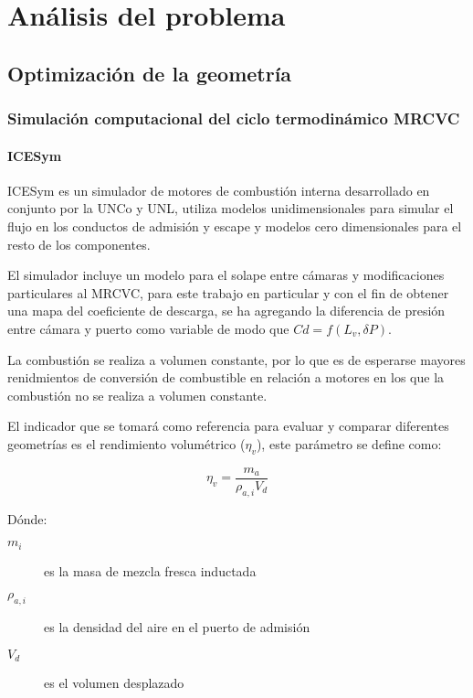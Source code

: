 \chapter{Análisis del problema}


\section{Optimización de la geometría}
\subsection{Simulación computacional del ciclo termodinámico MRCVC}
\subsubsection{ICESym}

ICESym \cite{icesym} es un simulador de motores de combustión interna
desarrollado en conjunto por la UNCo y UNL, utiliza modelos unidimensionales
para simular el flujo en los conductos de admisión y escape y modelos cero
dimensionales para el resto de los componentes.

El simulador incluye un modelo para el solape entre cámaras \cite{lopez16} y
modificaciones particulares al MRCVC, para este trabajo en particular  y con el
fin de obtener una mapa del coeficiente de descarga, se ha agregando la
diferencia de presión entre cámara y puerto como variable de modo que $Cd =
f(L_v, \delta P)$.

La combustión se realiza a volumen constante, por lo que es de esperarse
mayores renidmientos de conversión de combustible en relación a motores en los
que la combustión no se realiza a volumen constante.

El indicador que se tomará como referencia para evaluar y comparar diferentes
geometrías es el rendimiento volumétrico ($\eta_v$), este parámetro se define
como:

\begin{equation}
    \eta_v = \frac{m_a}{\rho_{a,i}V_d}
\end{equation}

Dónde:
\begin{description}
    \item[$m_i$] es la masa de mezcla fresca inductada
    \item[$\rho_{a,i}$] es la densidad del aire en el puerto de admisión
    \item[$V_d$] es el volumen desplazado
\end{description}


